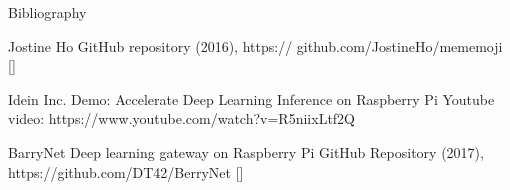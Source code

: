 \documentclass[compress]{beamer}
\begin{document}
\begin{frame}{Bibliography}
    \begin{thebibliography}{10}

\beamertemplatearticlebibitems
      Jostine Ho       
      \newblock {}
      \newblock GitHub repository (2016), https:// github.com/JostineHo/mememoji [\href{https:// github.com/JostineHo/mememoji}{\faGithub}]

	Idein Inc.
	\newblock Demo: Accelerate Deep Learning Inference on Raspberry Pi
	\newblock Youtube video: https://www.youtube.com/watch?v=R5niixLtf2Q

	BarryNet
	\newblock Deep learning gateway on Raspberry Pi
	\newblock GitHub Repository (2017), https://github.com/DT42/BerryNet [\href{https://github.com/DT42/BerryNet}{\faGithub}]

    \end{thebibliography}
\end{frame}




\closingtitle


\end{document}
